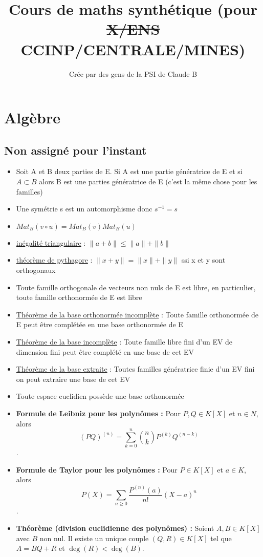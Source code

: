 \documentclass{article}
\title{Cours de maths synthétique (pour \sout{X/ENS} CCINP/CENTRALE/MINES)}
\author{Crée par des gens de la PSI de Claude B}
\begin{document}
\maketitle

\newpage

\tableofcontents

\newpage

\section{Algèbre}

\subsection{Non assigné pour l'instant}
\begin{itemize}[label=$\ast$]
	\item Soit A et B deux parties de E. Si A est une partie génératrice de E et si \( A \subset B \) alors B est une parties génératrice de E (c'est la même chose pour les familles)
	\item Une symétrie s est un automorphisme donc \(s^{-1} = s \)
	\item 	\( Mat_B(v \circ u) = Mat_B(v)Mat_B(u) \)
	\item \underline{inégalité triangulaire} : \( \|a + b\| \leq \|a\| + \|b\| \)
	\item \underline{théorème de pythagore} : \( \|x + y\| = \|x\| + \|y\| \) ssi x et y sont orthogonaux
	\item Toute famille orthogonale de vecteurs non nuls de E est libre, en particulier, toute famille orthonormée de E est libre
	\item \underline{Théorème de la base orthonormée incomplète} : Toute famille orthonormée de E peut être complétée en une base orthonormée de E
	\item \underline{Théorème de la base incomplète} : Toute famille libre fini d'un EV de dimension fini peut être complété en une base de cet EV
	\item \underline{Théorème de la base extraite} : Toutes familles génératrice finie d'un EV fini on peut extraire une base de cet EV
	\item Toute espace euclidien possède une base orthonormée
	\item \textbf{Formule de Leibniz pour les polynômes :} Pour \( P, Q \in K[X] \) et \( n \in N \), alors \[ (PQ)^{(n)} = \sum_{k=0}^{n} \binom{n}{k} P^{(k)}Q^{(n-k)} \].
	\item \textbf{Formule de Taylor pour les polynômes :} Pour \( P \in K[X] \) et \( a \in K \), alors \[ P(X) = \sum_{n \geq 0} \frac{P^{(n)}(a)}{n!}(X - a)^n \].
	\item \textbf{Théorème (division euclidienne des polynômes) :} Soient \( A, B \in K[X] \) avec \( B \) non nul. Il existe un unique couple \( (Q, R) \in K[X] \) tel que \( A = BQ + R \) et \( \deg(R) < \deg(B) \).



\end{itemize}
\end{document}
